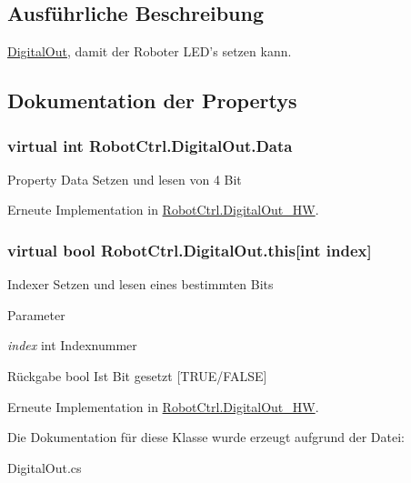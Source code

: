 \subsection{Ausführliche Beschreibung}
\hyperlink{class_robot_ctrl_1_1_digital_out}{DigitalOut}, damit der Roboter LED's setzen kann. 

\subsection{Dokumentation der Propertys}
\hypertarget{class_robot_ctrl_1_1_digital_out_a4c85a4bab149666840e9a551f62b6305}{
\subsubsection[{Data}]{\setlength{\rightskip}{0pt plus 5cm}virtual int RobotCtrl.DigitalOut.Data}}
\label{class_robot_ctrl_1_1_digital_out_a4c85a4bab149666840e9a551f62b6305}
Property Data Setzen und lesen von 4 Bit 

Erneute Implementation in \hyperlink{class_robot_ctrl_1_1_digital_out___h_w_ae374c259f09079b63f2bb6533e6ce5de}{RobotCtrl.DigitalOut\_\-HW}.

\hypertarget{class_robot_ctrl_1_1_digital_out_a4f57b73a7591bb053e7025eebb26d577}{
\subsubsection[{this}]{\setlength{\rightskip}{0pt plus 5cm}virtual bool RobotCtrl.DigitalOut.this\mbox{[}int index\mbox{]}}}
\label{class_robot_ctrl_1_1_digital_out_a4f57b73a7591bb053e7025eebb26d577}
Indexer Setzen und lesen eines bestimmten Bits


\begin{DoxyParams}{Parameter}
\item[{\em index}]int Indexnummer \end{DoxyParams}
\begin{DoxyReturn}{Rückgabe}
bool Ist Bit gesetzt \mbox{[}TRUE/FALSE\mbox{]} 
\end{DoxyReturn}


Erneute Implementation in \hyperlink{class_robot_ctrl_1_1_digital_out___h_w_a76f77544e88287efb3b2f273429b2ff0}{RobotCtrl.DigitalOut\_\-HW}.



Die Dokumentation für diese Klasse wurde erzeugt aufgrund der Datei:\begin{DoxyCompactItemize}
\item 
DigitalOut.cs\end{DoxyCompactItemize}
